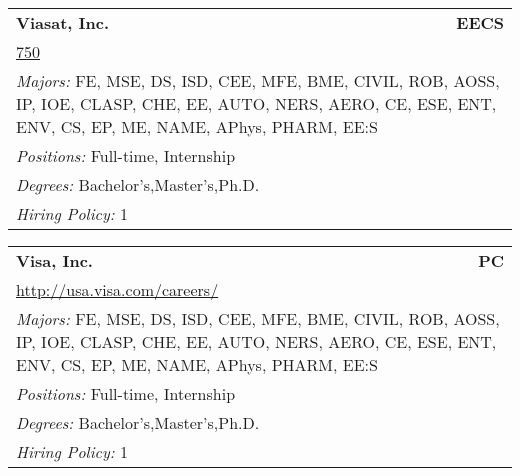 \documentclass[twoside]{article}
\begin{document}
\begin{center}
\begin{multicols}{3}
\begin{FlushLeft}
\begin{minipage}{.9\columnwidth}
\end{minipage}
 
\begin{minipage}{.9\columnwidth}\begin{tabularx}{.95\columnwidth}{Xr}
                 {\Large\bf Viasat, Inc.} & {\Large\bf EECS}\\
    \multicolumn{2}{p{.95\columnwidth}}{\url{750}}\\
    \multicolumn{2}{p{.95\columnwidth}}{\emph{Majors:} FE, MSE, DS, ISD, CEE, MFE, BME, CIVIL, ROB, AOSS, IP, IOE, CLASP, CHE, EE, AUTO, NERS, AERO, CE, ESE, ENT, ENV, CS, EP, ME, NAME, APhys, PHARM, EE:S}\\
    \multicolumn{2}{p{.95\columnwidth}}{\emph{Positions:} Full-time, Internship}\\
    \multicolumn{2}{p{.95\columnwidth}}{\emph{Degrees:} Bachelor's,Master's,Ph.D.}\\
    \multicolumn{2}{p{.95\columnwidth}}{\emph{Hiring Policy:} 1}\\
    \end{tabularx}
    
\end{minipage}
 
\begin{minipage}{.9\columnwidth}\begin{tabularx}{.95\columnwidth}{Xr}
                 {\Large\bf Visa, Inc.} & {\Large\bf PC}\\
    \multicolumn{2}{p{.95\columnwidth}}{\url{http://usa.visa.com/careers/}}\\
    \multicolumn{2}{p{.95\columnwidth}}{\emph{Majors:} FE, MSE, DS, ISD, CEE, MFE, BME, CIVIL, ROB, AOSS, IP, IOE, CLASP, CHE, EE, AUTO, NERS, AERO, CE, ESE, ENT, ENV, CS, EP, ME, NAME, APhys, PHARM, EE:S}\\
    \multicolumn{2}{p{.95\columnwidth}}{\emph{Positions:} Full-time, Internship}\\
    \multicolumn{2}{p{.95\columnwidth}}{\emph{Degrees:} Bachelor's,Master's,Ph.D.}\\
    \multicolumn{2}{p{.95\columnwidth}}{\emph{Hiring Policy:} 1}\\
    \end{tabularx}
    
\end{minipage}
 

\end{FlushLeft}
\end{multicols}
\end{center}
\end{document}
